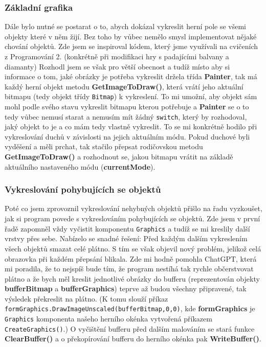 \documentclass[a4]{article}
\begin{document}
\subsubsection{Základní grafika} \label{staticgraphics}
Dále bylo nutné se postarat o to, abych dokázal vykreslit herní pole se všemi objekty které v něm žijí. Bez toho by vůbec nemělo smysl implementovat nějaké chování objektů. Zde jsem se inspiroval kódem, který jsme využívali na cvičeních z Programování 2. (konkrétně při modifikaci hry s padajícími balvany a diamanty) Rozhodl jsem se však pro větší obecnost a tudíž místo aby si informace o tom, jaké obrázky je potřeba vykreslit držela třída \textbf{Painter}, tak má každý herní objekt metodu \textbf{GetImageToDraw()}, která vrátí jeho aktuální bitmapu (tedy objekt třídy \verb|Bitmap|) k vykreslení. To mi umožní, aby objekt sám mohl podle svého stavu vykreslit bitmapu kterou potřebuje a \textbf{Painter} se o to tedy vůbec nemusí starat a nemusím mít žádný \verb|switch|, který by rozhodoval, jaký objekt to je a co mám tedy vlastně vykreslit. To se mi konkrétně hodilo při vykreslování duchů v závislosti na jejich aktuálním módu. Pokud duchové byli vyděšení a měli prchat, tak stačilo přepsat rodičovskou metodu \textbf{GetImageToDraw()} a rozhodnout se, jakou bitmapu vrátit na základě aktuálního nastaveného módu (\textbf{currentMode}).
\subsubsection{Vykreslování pohybujících se objektů} \label{buffering}
Poté co jsem zprovoznil vykreslování nehybných objektů přišlo na řadu vyzkoušet, jak si program povede s vykreslováním pohybujících se objektů. Zde jsem v první řadě zapomněl vždy vyčistit komponentu \verb|Graphics| a tudíž se mi kreslily další vrstvy přes sebe. Nabízelo se snadné řešení: Před každým dalším vykreslením všech objektů smazat celé plátno. S tím se však objevil nový problém, jelikož celá obrazovka při každém přepsání blikala. Zde mi hodně pomohla ChatGPT, která mi poradila, že to nejspíš bude tím, že program nestíhá tak rychle občerstvovat plátno a že bych měl kreslit jednotlivé obrázky do bufferu (reprezentován objekty \textbf{bufferBitmap} a \textbf{bufferGraphics}) teprve až budou všechny připravené, tak výsledek překreslit na plátno. (K tomu slouží příkaz \verb|formGraphics.DrawImageUnscaled(bufferBitmap,0,0)|, kde \textbf{formGraphics} je \verb|Graphics| komponenta našeho herního okénka vytvořená příkazem \verb|CreateGraphics()|.) O vyčištění bufferu před dalším malováním se stará funkce \textbf{ClearBuffer()} a o překopírování bufferu do herního okénka pak \textbf{WriteBuffer()}.
\end{document}
